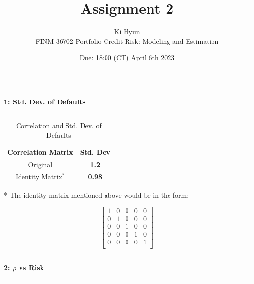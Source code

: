 \documentclass[11pt]{article}
\newcommand\question[2]{\vspace{.25in}\hrule\textbf{#1: #2}\vspace{.5em}\hrule\vspace{.10in}}
\renewcommand\part[1]{\vspace{.10in}\textbf{(#1)}}
\begin{document}
\raggedright


\newcommand\NAME{Ki Hyun}  %
\newcommand\ClassNumber{FINM 36702}
\newcommand\ClassName{Portfolio Credit Risk: Modeling and Estimation}    
\newcommand\ANUM{2}              %
\newcommand\duedate{18:00 (CT) April 6th 2023}	%

\title{Assignment \ANUM}
\author{\NAME \\ 
\ClassNumber \text{:} \ClassName}
\date{Due: \duedate}

\maketitle


\question{1}{Std. Dev. of Defaults}

\begin{table}[h]
\centering
\begin{tabular}{|c|c|}
\hline
\multicolumn{1}{|c|}{\textbf{Correlation Matrix}} & \multicolumn{1}{c|}{\textbf{Std. Dev}} \\
\hline
Original & \textbf{1.2} \\
\hline
Identity Matrix$^*$ & \textbf{0.98} \\
\hline
\end{tabular}
\caption{Correlation and Std. Dev. of Defaults}
\end{table}

* The identity matrix mentioned above would be in the form:

\[
\begin{bmatrix}
1 & 0 & 0 & 0 & 0 \\
0 & 1 & 0 & 0 & 0 \\
0 & 0 & 1 & 0 & 0 \\
0 & 0 & 0 & 1 & 0 \\
0 & 0 & 0 & 0 & 1 \\
\end{bmatrix}
\]

\question{2}{$\rho$ vs Risk}
\end{document}

